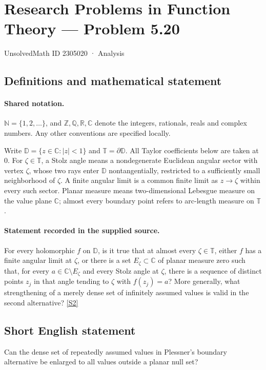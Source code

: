 \documentclass[11pt]{article}
\newcommand{\sref}[2]{\hyperlink{source:#1:#2}{[S#2]}}
\begin{document}
\setcounter{section}{2305019}
\section{Research Problems in Function Theory — Problem 5.20}\label{2305020}
{\small\sffamily UnsolvedMath ID 2305020 · Analysis}
\subsection{Definitions and mathematical statement}

\paragraph{Shared notation.}$\mathbb N=\{1,2,\ldots\}$, and $\mathbb Z,\mathbb Q,\mathbb R,\mathbb C$ denote the integers, rationals, reals and complex numbers. Any other conventions are specified locally.


Write $\mathbb D=\{z\in\mathbb C:|z|<1\}$ and $\mathbb T=\partial\mathbb D$. All Taylor coefficients below are taken at $0$. For $\zeta\in\mathbb T$, a Stolz angle means a nondegenerate Euclidean angular sector with vertex $\zeta$, whose two rays enter $\mathbb D$ nontangentially, restricted to a sufficiently small neighborhood of $\zeta$. A finite angular limit is a common finite limit as $z\to\zeta$ within every such sector. Planar measure means two-dimensional Lebesgue measure on the value plane $\mathbb C$; almost every boundary point refers to arc-length measure on $\mathbb T$.
\paragraph{Statement recorded in the supplied source.}
For every holomorphic $f$ on $\mathbb D$, is it true that at almost every $\zeta\in\mathbb T$, either $f$ has a finite angular limit at $\zeta$, or there is a set $E_\zeta\subset\mathbb C$ of planar measure zero such that, for every $a\in\mathbb C\setminus E_\zeta$ and every Stolz angle at $\zeta$, there is a sequence of distinct points $z_j$ in that angle tending to $\zeta$ with $f(z_j)=a$? More generally, what strengthening of a merely dense set of infinitely assumed values is valid in the second alternative? \sref{2305020}{2}
\subsection{Short English statement}
Can the dense set of repeatedly assumed values in Plessner’s boundary alternative be enlarged to all values outside a planar null set?
\end{document}
